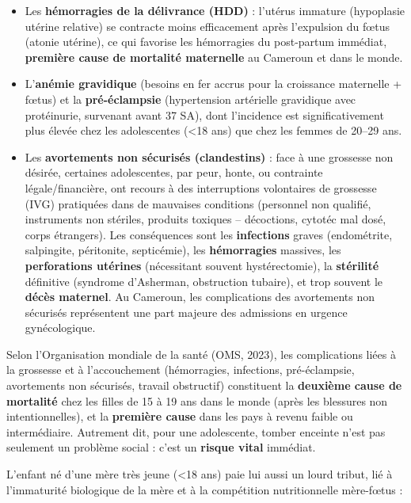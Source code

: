 \documentclass[11pt]{article}
\newcounter{popsec}
\newcounter{popsub}
\newcommand{\courssub}[1]{%
  \stepcounter{popsub}%
  \par\vspace{9pt}\noindent{\popxbold\fontsize{11.5}{13}\selectfont\color{popink}{\color{poporange}\thepopsec.\thepopsub}\hspace{6pt}#1}\par\nopagebreak\vspace{4pt}
}
\begin{document}
\begin{itemize}
\item Les \textbf{hémorragies de la délivrance (HDD)} : l'utérus immature (hypoplasie utérine relative) se contracte moins efficacement après l'expulsion du fœtus (atonie utérine), ce qui favorise les hémorragies du post-partum immédiat, \textbf{première cause de mortalité maternelle} au Cameroun et dans le monde.
\item L'\textbf{anémie gravidique} (besoins en fer accrus pour la croissance maternelle + fœtus) et la \textbf{pré-éclampsie} (hypertension artérielle gravidique avec protéinurie, survenant avant 37 SA), dont l'incidence est significativement plus élevée chez les adolescentes (\textless 18 ans) que chez les femmes de 20--29 ans.
\item Les \textbf{avortements non sécurisés (clandestins)} : face à une grossesse non désirée, certaines adolescentes, par peur, honte, ou contrainte légale/financière, ont recours à des interruptions volontaires de grossesse (IVG) pratiquées dans de mauvaises conditions (personnel non qualifié, instruments non stériles, produits toxiques -- décoctions, cytotéc mal dosé, corps étrangers). Les conséquences sont les \textbf{infections} graves (endométrite, salpingite, péritonite, septicémie), les \textbf{hémorragies} massives, les \textbf{perforations utérines} (nécessitant souvent hystérectomie), la \textbf{stérilité} définitive (syndrome d'Asherman, obstruction tubaire), et trop souvent le \textbf{décès maternel}. Au Cameroun, les complications des avortements non sécurisés représentent une part majeure des admissions en urgence gynécologique.
\end{itemize}

\begin{exemplebox}
Selon l'Organisation mondiale de la santé (OMS, 2023), les complications liées à la grossesse et à l'accouchement (hémorragies, infections, pré-éclampsie, avortements non sécurisés, travail obstructif) constituent la \textbf{deuxième cause de mortalité} chez les filles de 15 à 19 ans dans le monde (après les blessures non intentionnelles), et la \textbf{première cause} dans les pays à revenu faible ou intermédiaire. Autrement dit, pour une adolescente, tomber enceinte n'est pas seulement un problème social : c'est un \textbf{risque vital} immédiat.
\end{exemplebox}

\courssub{Conséquences sur l'enfant}

L'enfant né d'une mère très jeune (\textless 18 ans) paie lui aussi un lourd tribut, lié à l'immaturité biologique de la mère et à la compétition nutritionnelle mère-fœtus :
\end{document}
